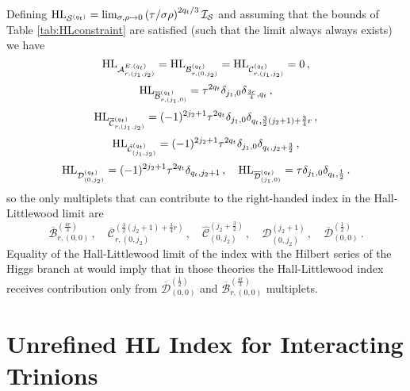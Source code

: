 \documentclass[main.tex]{subfiles}
\begin{document}
Defining $\textrm{HL}_{\mathcal{S}^{(q_t)}}=\lim_{\sigma,\rho\to0}\left(\tau/\sigma\rho\right)^{2q_t/3} \mathcal{I}_{\mathcal{S}}$ and assuming that the bounds of Table \ref{tab:HLconstraint} are satisfied (such that the limit always always exists) we have
\begin{equation}
\textrm{HL}_{{\mathcal{A}^{E,(q_t)}_{r,(j_1,j_2)}}}=\textrm{HL}_{\mathcal{B}^{(q_t)}_{r,(0,j_2)}}=\textrm{HL}_{\mathcal{C}^{(q_t)}_{r,(j_1,j_2)}}=0\,,\label{eqn:HLmultiind1}
\end{equation}
\begin{equation}
\textrm{HL}_{\overline{\mathcal{B}}^{(q_t)}_{r,(j_1,0)}}=\tau^{2q_t}\delta_{j_1,0}\delta_{\frac{3r}{4},q_t}\,,
\end{equation}
\begin{equation}
\textrm{HL}_{\overline{\mathcal{C}}^{(q_t)}_{r,(j_1,j_2)}}=(-1)^{2j_2+1}\tau^{2q_t}\delta_{j_1,0}\delta_{q_t,\frac{3}{2}(j_2+1)+\frac{3}{4}r}\,,
\end{equation}
\begin{equation}
\textrm{HL}_{\hat{\mathcal{C}}^{(q_t)}_{(j_1,j_2)}}=(-1)^{2j_2+1}\tau^{2q_t}\delta_{j_1,0}\delta_{q_t,j_2+\frac{3}{2}}\,,
\end{equation}
\begin{equation}
\textrm{HL}_{\mathcal{D}^{(q_t)}_{(0,j_2)}}=(-1)^{2j_2+1}\tau^{2q_t}\delta_{q_t,j_2+1}\,,\quad\textrm{HL}_{\overline{\mathcal{D}}^{(q_t)}_{(j_1,0)}}=\tau\delta_{j_1,0}\delta_{q_t,\frac{1}{2}}\,.\label{eqn:HLmultiind2}
\end{equation}
so the only multiplets that can contribute to the right-handed index in the Hall-Littlewood limit are
\begin{equation}
\overline{\mathcal{B}}^{(\frac{4r}{3})}_{r,(0,0)}\,,\quad \overline{\mathcal{C}}^{(\frac{3}{2}(j_2+1)+\frac{3}{4}r)}_{r,(0,j_2)}\,,\quad \hat{\mathcal{C}}^{(j_2+\frac{3}{2})}_{(0,j_2)}\,,\quad \mathcal{D}^{(j_2+1)}_{(0,j_2)}\,,\quad \overline{\mathcal{D}}^{(\frac{1}{2})}_{(0,0)}\,.
\end{equation}
Equality of the Hall-Littlewood limit of the index with the Hilbert series of the Higgs branch at would imply that in those theories the Hall-Littlewood index receives contribution only from $\overline{\mathcal{D}}^{(\frac{1}{2})}_{(0,0)}$ and $\overline{\mathcal{B}}^{(\frac{4r}{3})}_{r,(0,0)}$ multiplets.

\section{Unrefined HL Index for Interacting Trinions}\label{app:3puncHL}
\end{document}
